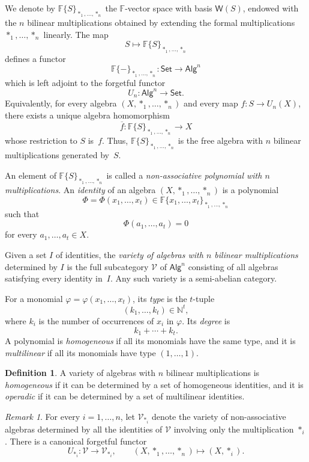\documentclass[reqno,a4paper]{amsart}
\theoremstyle{plain}
\theoremstyle{definition}
\newtheorem{definition}[subsection]{Definition}
\theoremstyle{remark}
\newtheorem{remark}[subsection]{Remark}
\numberwithin{equation}{section}
\newcommand{\F}{\mathbb{F}}
\newcommand{\V}{\mathcal{V}}
\newcommand{\Set}{\ensuremath{\mathsf{Set}}}
\newcommand{\Alg}{\ensuremath{\mathsf{Alg}}}
\begin{document}
We denote by $\F\{S\}_{\ast_1,\ldots,\ast_n}$
the $\F$-vector space with basis $\mathsf{W}(S)$, endowed with the $n$ bilinear multiplications obtained by extending the formal multiplications $\ast_1,\ldots,\ast_n$ linearly. The map
\[
S\longmapsto\F\{S\}_{\ast_1,\ldots,\ast_n}
\]
defines a functor
\[
\F\{-\}_{\ast_1,\ldots,\ast_n}\colon\Set\to\Alg^n
\]
which is left adjoint to the forgetful functor
\[
U_n\colon\Alg^n\to\Set.
\]
Equivalently, for every algebra $(X,\ast_1,\ldots,\ast_n)$ and every map $f\colon S\to U_n(X)$, there exists a unique algebra homomorphism
\[
\overline{f}\colon\F\{S\}_{\ast_1,\ldots,\ast_n}\to X
\]
whose restriction to $S$ is~$f$. Thus, $\F\{S\}_{\ast_1,\ldots,\ast_n}$ is the free algebra with $n$ bilinear multiplications generated by~$S$.

An element of $\F\{S\}_{\ast_1,\ldots,\ast_n}$ is called a \emph{non-associative polynomial with $n$ multiplications}. An \emph{identity} of an algebra $(X,\ast_1,\ldots,\ast_n)$ is a polynomial
\[
\Phi=\Phi(x_1,\ldots,x_t)
\in
\F\{x_1,\ldots,x_t\}_{\ast_1,\ldots,\ast_n}
\]
such that
\[
\Phi(a_1,\ldots,a_t)=0
\]
for every $a_1,\ldots,a_t\in X$.

Given a set $I$ of identities, the \emph{variety of algebras with $n$ bilinear multiplications} determined by $I$ is the full subcategory $\V$ of $\Alg^n$ consisting of all algebras satisfying every identity in~$I$. Any such variety is a semi-abelian category.

For a monomial $\varphi=\varphi(x_1,\ldots,x_t)$, its \emph{type} is the $t$-tuple
\[
(k_1,\ldots,k_t)\in\mathbb{N}^t,
\]
where $k_i$ is the number of occurrences of $x_i$ in $\varphi$. Its \emph{degree} is
\[
k_1+\cdots+k_t.
\]
A polynomial is \emph{homogeneous} if all its monomials have the same type, and it is \emph{multilinear} if all its monomials have type $(1,\ldots,1)$.

\begin{definition}
A variety of algebras with $n$ bilinear multiplications is \emph{homogeneous} if it can be determined by a set of homogeneous identities, and it is \emph{operadic} if it can be determined by a set of multilinear identities.
\end{definition}

\begin{remark}
For every $i=1,\ldots,n$, let $\V_{\ast_i}$ denote the variety of non-associative algebras determined by all the identities of $\V$ involving only the multiplication $\ast_i$. There is a canonical forgetful functor
\[
U_{\ast_i}\colon\V\to\V_{\ast_i},
\qquad
(X,\ast_1,\ldots,\ast_n)\longmapsto(X,\ast_i).
\]
\end{remark}
\end{document}
